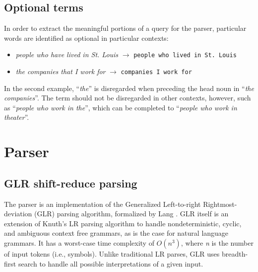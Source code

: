 \documentclass{article}
\begin{document}
\subsection{Optional terms}
In order to extract the meaningful portions of a query for the parser, particular words are identified as optional in particular contexts:
\begin{itemize}
\item \textit{people who have lived in St. Louis} $\rightarrow$ \texttt{people who lived in St.\ Louis}
\item \textit{the companies that I work for} $\rightarrow$ \texttt{companies I work for}
\end{itemize}
In the second example, ``\textit{the}'' is disregarded when preceding the head noun in ``\textit{the companies}''. The term should not be disregarded in other contexts, however, such as ``\textit{people who work in the}'', which can be completed to ``\textit{people who work in theater}''.


\section{Parser}
\subsection{GLR shift-reduce parsing}
The parser is an implementation of the Generalized Left-to-right Rightmost-deviation (GLR) parsing algorithm, formalized by Lang \citep{Lang1974}. GLR itself is an extension of Knuth's LR parsing algorithm \citep{Knuth1965} to handle nondeterministic, cyclic, and ambiguous context free grammars, as is the case for natural language grammars. It has a worst-case time complexity of $O(n^3)$, where \textit{n} is the number of input tokens (i.e., symbols). Unlike traditional LR parses, GLR uses breadth-first search to handle all possible interpretations of a given input.
\end{document}

